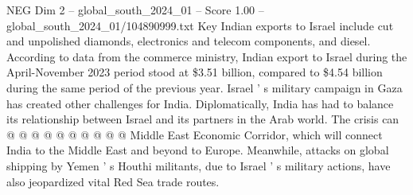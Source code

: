 \begin{textsample}{NEG Dim 2 – global\_south\_2024\_01 – Score 1.00 – global\_south\_2024\_01/104890999.txt}
Key Indian exports to Israel include cut and unpolished diamonds, electronics and telecom components, and diesel.
According to data from the commerce ministry, Indian export to Israel during the April-November 2023 period stood at \$3.51 billion, compared to \$4.54 billion during the same period of the previous year.
Israel ' s military campaign in Gaza has created other challenges for India.
Diplomatically, India has had to balance its relationship between Israel and its partners in the Arab world.
The crisis can @ @ @ @ @ @ @ @ @ @ Middle East Economic Corridor, which will connect India to the Middle East and beyond to Europe.
Meanwhile, attacks on global shipping by Yemen ' s Houthi militants, due to Israel ' s military actions, have also jeopardized vital Red Sea trade routes.

\end{textsample}
